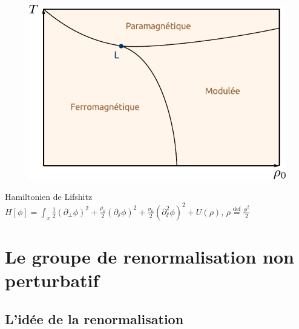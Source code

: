 \documentclass[xcolor=dvipsnames]{beamer}
\newcommand{\p}[1]{\partial_{#1}}
\newcommand{\define}{\ensuremath{ \overset{\text{def}}{=} }}
\begin{document}
\begin{frame}

\begin{figure}[htp]
\centering
\includegraphics[scale=0.65]{img/phase_diagram.pdf}
\label{}
\end{figure}

\begin{block}{Hamiltonien de Lifshitz}
\centering
$ H[\phi] = \int_x  \frac{1}{2}(\p{\perp} \phi)^2 + \frac{\rho_0}{2}(\p{\sslash}\phi)^2 + \frac{\sigma_0}{2} (\p{\sslash}^2 \phi)^2 + U(\rho) \text{,~} \rho \define \frac{\phi^2}{2}$
\end{block}

\end{frame}

\section{Le groupe de renormalisation non perturbatif}
\subsection{L'idée de la renormalisation}
\end{document}
